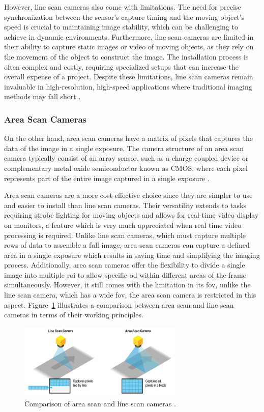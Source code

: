 However, line scan cameras also come with limitations. The need for precise synchronization between the sensor’s capture timing and the moving object’s speed is crucial to maintaining image stability, which can be challenging to achieve in dynamic environments. Furthermore, line scan cameras are limited in their ability to capture static images or video of moving objects, as they rely on the movement of the object to construct the image. The installation process is often complex and costly, requiring specialized setups that can increase the overall expense of a project. Despite these limitations, line scan cameras remain invaluable in high-resolution, high-speed applications where traditional imaging methods may fall short \cite{AS_VS_LS_ART}.

\subsubsection{Area Scan Cameras}
On the other hand, area scan cameras have a matrix of pixels that captures the data of the image in a single exposure. The camera structure of an area scan camera typically consist of an array sensor, such as a charge coupled device or complementary metal oxide semiconductor known as CMOS, where each pixel represents part of the entire image captured in a single exposure \cite{AS_VS_LS_ART}. 

Area scan cameras are a more cost-effective choice since they are simpler to use and easier to install than line scan cameras. Their versatility extends to tasks requiring strobe lighting for moving objects and allows for real-time video display on monitors, a feature which is very much appreciated when real time video processing is required. Unlike line scan cameras, which must capture multiple rows of data to assemble a full image, area scan cameras can capture a defined area in a single exposure which results in saving time and simplifying the imaging process. Additionally, area scan cameras offer the flexibility to divide a single image into multiple \gls{roi} to allow specific \gls{od} within different areas of the frame simultaneously. However, it still comes with the limitation in its \gls{fov}, unlike the line scan camera, which has a wide \gls{fov}, the area scan camera is restricted in this aspect. Figure~\ref{AS_VS_LS_PIC} illustrates a comparison between area scan and line scan cameras in terms of their working principles.

\begin{figure}[h]
    \centering
    \includegraphics[width=0.7\textwidth]{Figures/Line-Scan-v-Area-Scan.png}  
    \caption{Comparison of area scan and line scan cameras \cite{AS_VS_LS_PIC}.}
    \label{AS_VS_LS_PIC}
\end{figure}


